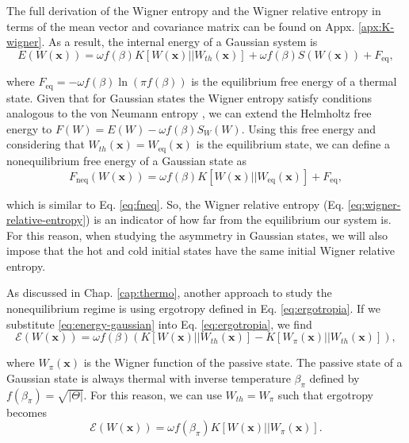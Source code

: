 \noindent The full derivation of the Wigner entropy and the Wigner relative entropy in terms of the mean vector and covariance matrix can be found on Appx. \ref{apx:K-wigner}. As a result, the internal energy of a Gaussian system is
\begin{equation}
    E(W(\mathbf{x})) = \omega f(\beta) K[W(\mathbf{x}) || W_{th}(\mathbf{x})] + \omega f(\beta) S(W(\mathbf{x})) + F_{\text{eq}},
    \label{eq:energy-gaussian}
\end{equation}

\noindent where $F_{\text{eq}} = -\omega f(\beta) \ln (\pi f(\beta))$ is the equilibrium free energy of a thermal state. Given that for Gaussian states the Wigner entropy satisfy conditions analogous to the von Neumann entropy \cite{adesso-2016}, we can extend the Helmholtz free energy to $F(W) = E(W) - \omega f(\beta)S_W(W)$. Using this free energy and considering that $W_{th}(\mathbf{x}) = W_{\text{eq}}(\mathbf{x})$ is the equilibrium state, we can define a nonequilibrium free energy of a Gaussian state as
\begin{equation}
    F_{\text{neq}}(W(\mathbf{x})) = \omega f(\beta) K[W(\mathbf{x}) || W_{\text{eq}}(\mathbf{x})] + F_{\text{eq}},
\end{equation}

\noindent which is similar to Eq. \eqref{eq:fneq}. So, the Wigner relative entropy (Eq. \eqref{eq:wigner-relative-entropy}) is an indicator of how far from the equilibrium our system is. For this reason, when studying the asymmetry in Gaussian states, we will also impose that the hot and cold initial states have the same initial Wigner relative entropy.

As discussed in Chap. \ref{cap:thermo}, another approach to study the nonequilibrium regime is using ergotropy defined in Eq. \eqref{eq:ergotropia}. If we substitute \eqref{eq:energy-gaussian} into Eq. \eqref{eq:ergotropia}, we find
\begin{equation}
    \mathcal{E}(W(\mathbf{x})) = \omega f(\beta) (K[W(\mathbf{x}) || W_{th}(\mathbf{x})] - K[W_\pi(\mathbf{x}) || W_{th}(\mathbf{x})]),
    \label{eq:ergotropy-gaussian-full}
\end{equation}

\noindent where $W_\pi(\mathbf{x})$ is the Wigner function of the passive state. The passive state of a Gaussian state is always thermal with inverse temperature $\beta_\pi$ defined by $f(\beta_\pi) = \sqrt{|\Theta|}$. For this reason, we can use $W_{th}=W_\pi$ such that ergotropy becomes \cite{medina-2025}
\begin{equation}
    \mathcal{E}(W(\mathbf{x})) = \omega f(\beta_\pi) K[W(\mathbf{x}) || W_{\pi}(\mathbf{x})].
    \label{eq:ergotropy-gaussian-passive}
\end{equation}

